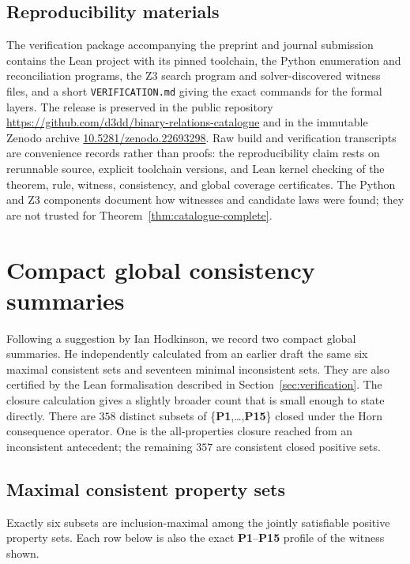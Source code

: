 \documentclass[11pt,a4paper,reqno]{amsart}
\theoremstyle{definition}
\theoremstyle{remark}
\newcommand{\prop}[1]{\textbf{P#1}}
\begin{document}
\subsection{Reproducibility materials}

The verification package accompanying the preprint and journal submission
contains the Lean project with its pinned toolchain, the Python enumeration and
reconciliation programs, the Z3 search program and solver-discovered witness
files, and a short \texttt{VERIFICATION.md} giving the exact commands for the
formal layers.  The release is preserved in the public repository
\url{https://github.com/d3dd/binary-relations-catalogue} and in the immutable
Zenodo archive
\href{https://doi.org/10.5281/zenodo.22693298}{10.5281/zenodo.22693298}.
Raw build and verification transcripts are
convenience records rather than proofs: the reproducibility claim rests on
rerunnable source, explicit toolchain versions, and Lean kernel checking of the
theorem, rule, witness, consistency, and global coverage certificates.  The
Python and Z3 components document how witnesses and candidate laws were found;
they are not trusted for Theorem~\ref{thm:catalogue-complete}.

\section{Compact global consistency summaries}\label{sec:global-summaries}

Following a suggestion by Ian Hodkinson, we record two compact global
summaries.  He independently calculated from an earlier draft the same six
maximal consistent sets and seventeen minimal inconsistent sets.  They are also certified by the Lean formalisation described in
Section~\ref{sec:verification}.  The closure calculation gives a slightly
broader count that is small enough to state directly.  There are $358$ distinct
subsets of \{\prop{1},\ldots,\prop{15}\} closed under the Horn consequence
operator.  One is the all-properties closure reached from an inconsistent
antecedent; the remaining $357$ are consistent closed positive sets.

\subsection{Maximal consistent property sets}

Exactly six subsets are inclusion-maximal among the jointly satisfiable
positive property sets.  Each row below is also the exact
\prop{1}--\prop{15} profile of the witness shown.
\end{document}
